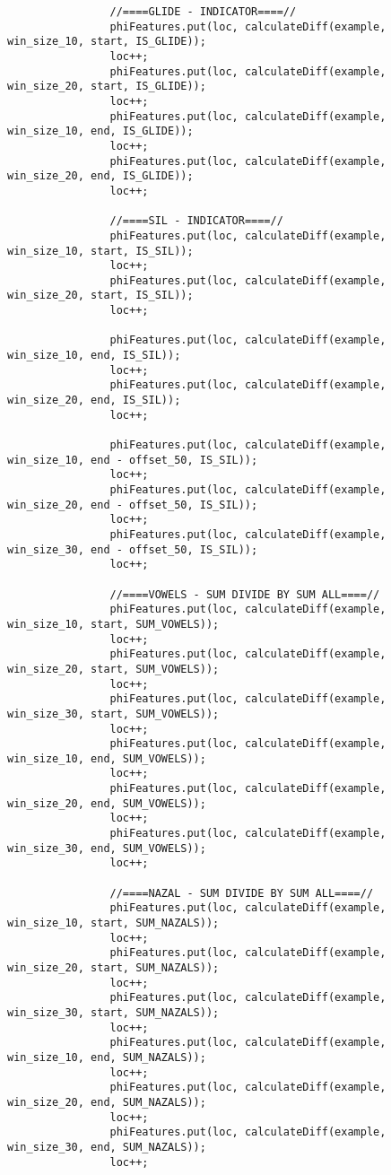 \documentclass[11pt, oneside]{article}   	%
\begin{document}
\begin{lstlisting}
                //====GLIDE - INDICATOR====//
                phiFeatures.put(loc, calculateDiff(example, win_size_10, start, IS_GLIDE));
                loc++;
                phiFeatures.put(loc, calculateDiff(example, win_size_20, start, IS_GLIDE));
                loc++;
                phiFeatures.put(loc, calculateDiff(example, win_size_10, end, IS_GLIDE));
                loc++;
                phiFeatures.put(loc, calculateDiff(example, win_size_20, end, IS_GLIDE));
                loc++;

                //====SIL - INDICATOR====//
                phiFeatures.put(loc, calculateDiff(example, win_size_10, start, IS_SIL));
                loc++;
                phiFeatures.put(loc, calculateDiff(example, win_size_20, start, IS_SIL));
                loc++;

                phiFeatures.put(loc, calculateDiff(example, win_size_10, end, IS_SIL));
                loc++;
                phiFeatures.put(loc, calculateDiff(example, win_size_20, end, IS_SIL));
                loc++;

                phiFeatures.put(loc, calculateDiff(example, win_size_10, end - offset_50, IS_SIL));
                loc++;
                phiFeatures.put(loc, calculateDiff(example, win_size_20, end - offset_50, IS_SIL));
                loc++;
                phiFeatures.put(loc, calculateDiff(example, win_size_30, end - offset_50, IS_SIL));
                loc++;

                //====VOWELS - SUM DIVIDE BY SUM ALL====//
                phiFeatures.put(loc, calculateDiff(example, win_size_10, start, SUM_VOWELS));
                loc++;
                phiFeatures.put(loc, calculateDiff(example, win_size_20, start, SUM_VOWELS));
                loc++;
                phiFeatures.put(loc, calculateDiff(example, win_size_30, start, SUM_VOWELS));
                loc++;
                phiFeatures.put(loc, calculateDiff(example, win_size_10, end, SUM_VOWELS));
                loc++;
                phiFeatures.put(loc, calculateDiff(example, win_size_20, end, SUM_VOWELS));
                loc++;
                phiFeatures.put(loc, calculateDiff(example, win_size_30, end, SUM_VOWELS));
                loc++;

                //====NAZAL - SUM DIVIDE BY SUM ALL====//
                phiFeatures.put(loc, calculateDiff(example, win_size_10, start, SUM_NAZALS));
                loc++;
                phiFeatures.put(loc, calculateDiff(example, win_size_20, start, SUM_NAZALS));
                loc++;
                phiFeatures.put(loc, calculateDiff(example, win_size_30, start, SUM_NAZALS));
                loc++;
                phiFeatures.put(loc, calculateDiff(example, win_size_10, end, SUM_NAZALS));
                loc++;
                phiFeatures.put(loc, calculateDiff(example, win_size_20, end, SUM_NAZALS));
                loc++;
                phiFeatures.put(loc, calculateDiff(example, win_size_30, end, SUM_NAZALS));
                loc++;


\end{lstlisting}
\end{document}
